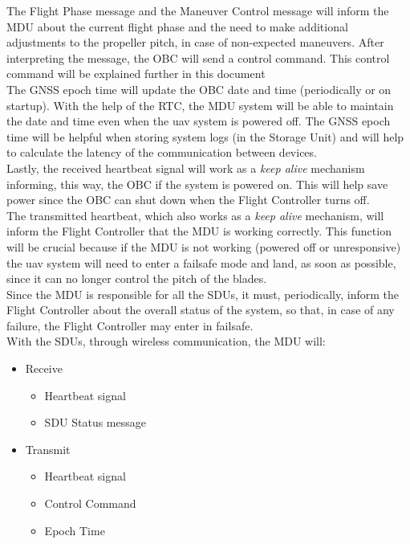 The Flight Phase message and the Maneuver Control message will inform the MDU about the current flight phase and the need to make additional adjustments to the propeller pitch, in case of non-expected maneuvers.
After interpreting the message, the \gls{OBC} will send a control command. This control command will be explained further in this document\\

The \gls{GNSS} epoch time will update the \gls{OBC} date and time (periodically or on startup). With the help of the \gls{RTC}, the MDU system will be able to maintain the date and time even when the \gls{uav} system is powered off.
The \gls{GNSS} epoch time will be helpful when storing system logs (in the Storage Unit) and will help to calculate the latency of the communication between devices.\\

Lastly, the received heartbeat signal will work as a \textit{keep alive} mechanism informing, this way, the \gls{OBC} if the system is powered on.
This will help save power since the \gls{OBC} can shut down when the Flight Controller turns off.\\

The transmitted heartbeat, which also works as a \textit{keep alive} mechanism, will inform the Flight Controller that the MDU is working correctly.
This function will be crucial because if the MDU is not working (powered off or unresponsive) the \gls{uav} system will need to enter a failsafe mode and land, as soon as possible, since it can no longer control the pitch of the blades.\\

Since the MDU is responsible for all the SDUs, it must, periodically, inform the Flight Controller about the overall status of the system, so that, in case of any failure, the Flight Controller may enter in failsafe.\\

With the SDUs, through wireless communication, the MDU will:
\begin{itemize}
    \item Receive
          \begin{itemize}
              \item Heartbeat signal
              \item SDU Status message
          \end{itemize}
    \item Transmit
          \begin{itemize}
              \item Heartbeat signal
              \item Control Command
              \item Epoch Time
          \end{itemize}
\end{itemize}

